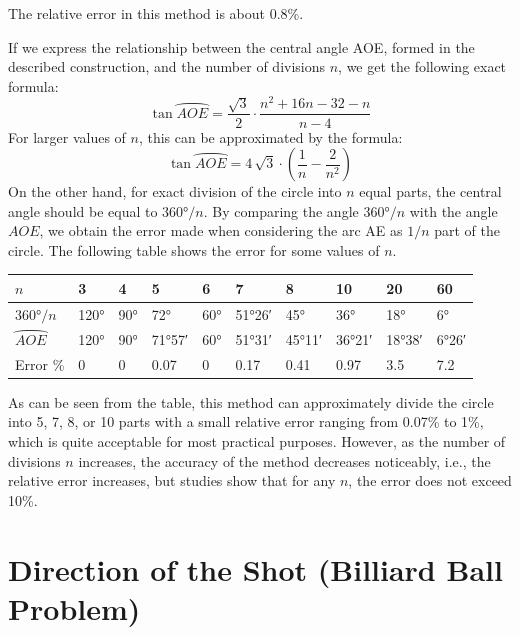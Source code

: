 The relative error in this method is about 0.8\%.


If we express the relationship between the central angle AOE, formed in the described construction, and the number of divisions \( n \), we get the following exact formula:
\begin{equation*}%
\tan \wideparen{AOE} = \frac{\sqrt{3}}{2} \cdot \frac{n^2 + 16n - 32 - n}{n - 4}
\end{equation*}
For larger values of \( n \), this can be approximated by the formula:
\begin{equation*}%
\tan \wideparen{AOE} = 4 \, \sqrt{3} \cdot \left(\frac{1}{n} - \frac{2}{n^2}\right)
\end{equation*}
On the other hand, for exact division of the circle into \( n \) equal parts, the central angle should be equal to \(\ang{360}/n \). By comparing the angle  \(\ang{360}/n \) with the angle $AOE$, we obtain the error made when considering the arc AE as \( 1/n \) part of the circle. The following table shows the error for some values of \( n \).

\begin{table}
\centering
\begin{small}
\begin{tabular}{p{1cm}lllllllll}
\toprule
$n$	& 3	& 4	& 5	& 6	& 7	& 8	& 10	 & 20 & 60 \\
\midrule
$\ang{360}/n$ &	\ang{120} & 	\ang{90} & 	\ang{72} & 	\ang{60} & 	\ang{51;26}	& \ang{45} & \ang{36} & \ang{18} & \ang{6}\\
$\wideparen{AOE}$	&	\ang{120} & 	\ang{90} & 	\ang{71;57} & 	\ang{60} & 	\ang{51;31}	& \ang{45;11} & \ang{36;21} & \ang{18;38} & \ang{6;26}\\
Error \% & 0 & 0 & 0.07 & 0 & 0.17 & 0.41 & 0.97 &  3.5 & 7.2 \\
\bottomrule
\end{tabular}
\end{small}
\end{table}

As can be seen from the table, this method can approximately divide the circle into 5, 7, 8, or 10 parts with a small relative error ranging from 0.07\% to 1\%, which is quite acceptable for most practical purposes. However, as the number of divisions \( n \) increases, the accuracy of the method decreases noticeably, i.e., the relative error increases, but studies show that for any \( n \), the error does not exceed 10\%.




\section[Billiard Ball Problem]{Direction of the Shot (Billiard Ball Problem)}

